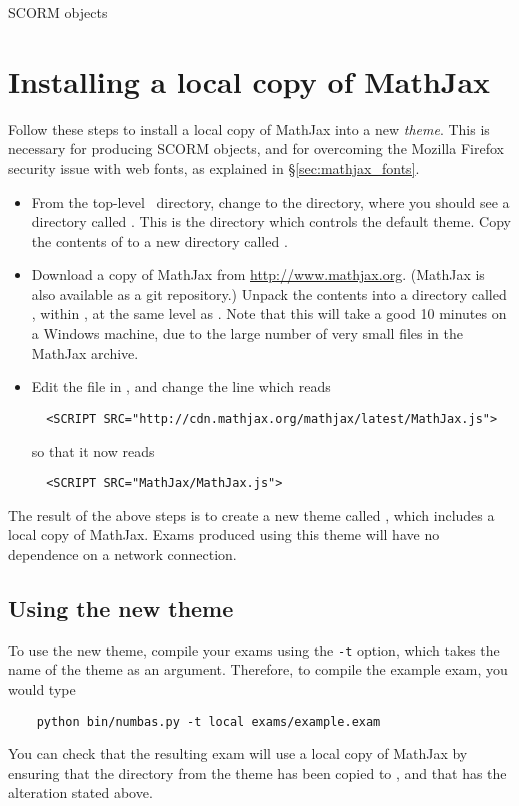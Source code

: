 \begin{chapter}{\label{cha:scorm}SCORM objects}
  \section{\label{sec:local_mathjax}Installing a local copy of MathJax}
  Follow these steps to install a local copy of MathJax into a new
  \emph{theme}.  This is necessary for producing SCORM objects, and for
  overcoming the Mozilla Firefox security issue with web fonts, as explained in
  \S\ref{sec:mathjax_fonts}.
  \begin{itemize}
    \item From the top-level \numbas\ directory, change to the
       directory, where you should see a directory called
      .  This is the directory which controls the default
      theme.  Copy the contents of  to a new directory called
      .
    \item Download a copy of MathJax from \url{http://www.mathjax.org}.
      (MathJax is also available as a git repository.)  Unpack the contents
      into a directory called , within , at
      the same level as .  Note that this will take a good
      10 minutes on a Windows machine, due to the large number of very small
      files in the MathJax archive.
    \item Edit the file  in , and
      change the line which reads
      {\small
      \begin{Verbatim}
  <SCRIPT SRC="http://cdn.mathjax.org/mathjax/latest/MathJax.js">
      \end{Verbatim}
      }
      so that it now reads
      {\small
      \begin{Verbatim}
  <SCRIPT SRC="MathJax/MathJax.js">
      \end{Verbatim}
      }
  \end{itemize}
  The result of the above steps is to create a new theme called
  , which includes a local copy of MathJax.  Exams produced
  using this theme will have no dependence on a network connection.

  \subsection{Using the new theme}
  To use the new  theme, compile your exams using the
  \verb"-t" option, which takes the name of the theme as an argument.
  Therefore, to compile the example exam, you would type
  \begin{Verbatim}
    python bin/numbas.py -t local exams/example.exam
  \end{Verbatim}
  You can check that the resulting exam will use a local copy of MathJax by
  ensuring that the  directory from the theme has been copied
  to , and that  has the
  alteration stated above.


\end{chapter}
